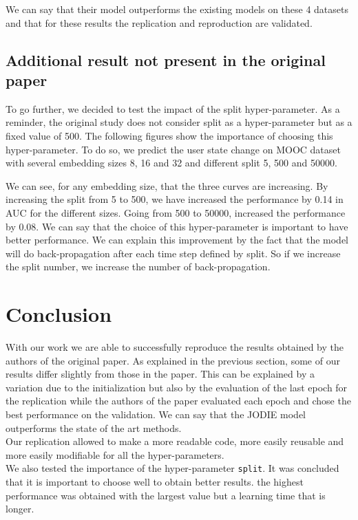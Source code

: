 We can say that their model outperforms the existing models on these 4 datasets and that for these results the replication and reproduction are validated.

\subsection*{Additional result not present in the original paper}

To go further, we decided to test the impact of the split hyper-parameter. As a reminder, the original study does not consider split as a hyper-parameter but as a fixed value of 500. The following figures show the importance of choosing this hyper-parameter. To do so, we predict the user state change on MOOC dataset with several embedding sizes 8, 16 and 32 and different split 5, 500 and 50000.


We can see, for any embedding size, that the three curves are increasing. By increasing the split from 5 to 500, we have increased the performance by 0.14 in AUC for the different sizes. Going from 500 to 50000, increased the performance by 0.08. We can say that the choice of this hyper-parameter is important to have better performance. We can explain this improvement by the fact that the model will do back-propagation after each time step defined by split. So if we increase the split number, we increase the number of back-propagation.

\section*{Conclusion}
With our work we are able to successfully reproduce the results obtained by the authors of the original paper. As explained in the previous section, some of our results differ slightly from those in the paper. This can be explained by a variation due to the initialization but also by the evaluation of the last epoch for the replication while the authors of the paper evaluated each epoch and chose the best performance on the validation. We can say that the JODIE model outperforms the state of the art methods. \\
Our replication allowed to make a more readable code, more easily reusable and more easily modifiable for all the hyper-parameters.\\
We also tested the importance of the hyper-parameter \texttt{split}. It was concluded that it is important to choose well to obtain better results. the highest performance was obtained with the largest value  but a learning time that is longer. 

